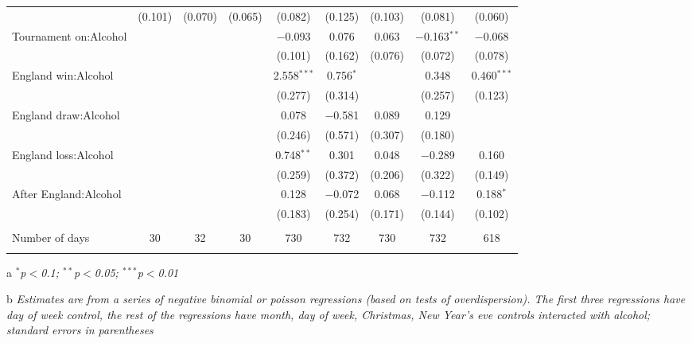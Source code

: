 \documentclass[12pt, letterpaper]{article}
\begin{document}
\begin{table}
{\begin{threeparttable}
\begin{tabular}{@{\extracolsep{5pt}}lcccccccc}
  & (0.101) & (0.070) & (0.065) & (0.082) & (0.125) & (0.103) & (0.081) & (0.060) \\ 
  Tournament on:Alcohol &  &  &  & $-$0.093 & 0.076 & 0.063 & $-$0.163$^{**}$ & $-$0.068 \\ 
  &  &  &  & (0.101) & (0.162) & (0.076) & (0.072) & (0.078) \\ 
  England win:Alcohol &  &  &  & 2.558$^{***}$ & 0.756$^{*}$ &  & 0.348 & 0.460$^{***}$ \\ 
  &  &  &  & (0.277) & (0.314) &  & (0.257) & (0.123) \\ 
  England draw:Alcohol &  &  &  & 0.078 & $-$0.581 & 0.089 & 0.129 &  \\ 
  &  &  &  & (0.246) & (0.571) & (0.307) & (0.180) &  \\ 
  England loss:Alcohol &  &  &  & 0.748$^{**}$ & 0.301 & 0.048 & $-$0.289 & 0.160 \\ 
  &  &  &  & (0.259) & (0.372) & (0.206) & (0.322) & (0.149) \\ 
  After England:Alcohol &  &  &  & 0.128 & $-$0.072 & 0.068 & $-$0.112 & 0.188$^{*}$ \\ 
  &  &  &  & (0.183) & (0.254) & (0.171) & (0.144) & (0.102) \\ 
 \hline \\[-1.8ex] 
Number of days & 30 & 32 & 30 & 730 & 732 & 730 & 732 & 618 \\ 
\hline 
\hline \\[-1.8ex] 
\end{tabular} 
\begin{tablenotes}
      \item[a] \textit{$^{*}$p$<$0.1; $^{**}$p$<$0.05; $^{***}$p$<$0.01}
      \item[b] \textit{Estimates are from a series of negative binomial  or poisson regressions (based on tests of overdispersion). The first three regressions have day of week control, the rest of the regressions have month, day of week, Christmas, New Year's eve controls interacted with alcohol; standard errors in parentheses}
    \end{tablenotes}
\end{threeparttable} }
\end{table}
\end{document}
